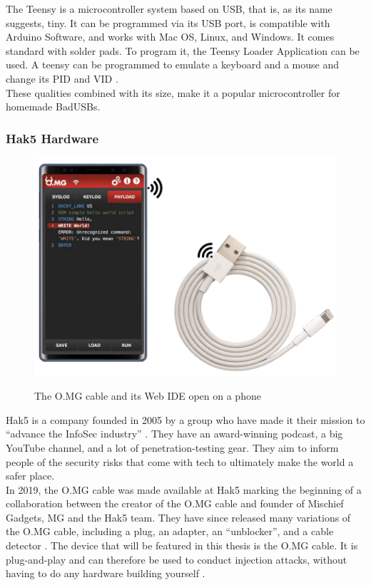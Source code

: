 The Teensy  \cite{TeensyUSBDevelopment} is a microcontroller system based on USB, that is, as its name suggests, tiny. It can be programmed via its USB port, is compatible with Arduino Software, and works with Mac OS, Linux, and Windows. It comes standard with solder pads. To program it, the Teensy Loader Application can be used.
A teensy can be programmed to emulate a keyboard and a mouse and change its PID and VID \cite{farhiMalboardNovelUser2019}.\\
These qualities combined with its size, make it a popular microcontroller for homemade BadUSBs. 


\subsubsection{Hak5 Hardware} \label{Hak5Hardware}

\begin{figure}[H]
    \centering
    \includegraphics[width=0.5\linewidth]{visuals/OMGCable.png}
    \caption{The O.MG cable and its Web IDE open on a phone}
    \label{fig:OMGCable}
    \cite{hak5MGCable}
\end{figure}

Hak5 is a company founded in 2005 by a group who have made it their mission to ``advance the InfoSec industry'' \cite{hak5}. They have an award-winning podcast, a big YouTube channel, and a lot of penetration-testing gear. They aim to inform people of the security risks that come with tech to ultimately make the world a safer place. \\
In 2019, the O.MG cable was made available at Hak5 \cite{MGCable2019a} marking the beginning of a collaboration between the creator of the O.MG cable and founder of Mischief Gadgets, MG \cite{MGCable2019a} and the Hak5 team. They have since released many variations of the O.MG cable, including a plug, an adapter, an ``unblocker'', and a cable detector \cite{hak5MischiefGadgets}. The device that will be featured in this thesis is the O.MG cable. It is plug-and-play and can therefore be used to conduct injection attacks, without having to do any hardware building yourself \cite{hak5MGCable}. 



